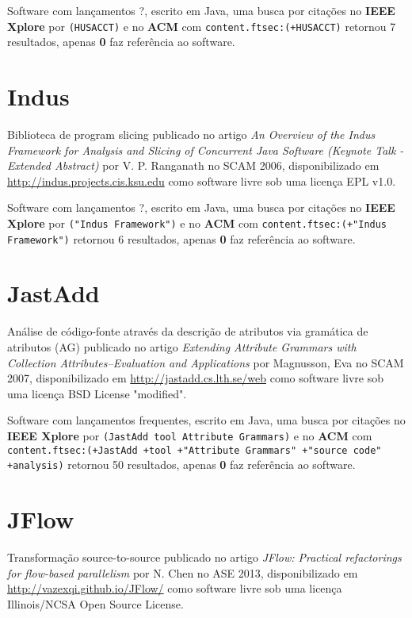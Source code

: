 Software com lançamentos ?,
escrito em Java,
uma busca por citações no {\bf IEEE Xplore} por
\texttt{(HUSACCT)}
e no {\bf ACM} com
\texttt{content.ftsec:(+HUSACCT)}
retornou
7 resultados, apenas
{\bf 0} faz referência ao software.



\section{Indus}

Biblioteca de program slicing
publicado no artigo {\it An Overview of the Indus Framework for Analysis and Slicing of Concurrent Java Software (Keynote Talk - Extended Abstract)}
por V. P. Ranganath
no SCAM 2006,
disponibilizado em \url{http://indus.projects.cis.ksu.edu}
como software livre
sob uma licença EPL v1.0.

Software com lançamentos ?,
escrito em Java,
uma busca por citações no {\bf IEEE Xplore} por
\texttt{("Indus Framework")}
e no {\bf ACM} com
\texttt{content.ftsec:(+"Indus Framework")}
retornou
6 resultados, apenas
{\bf 0} faz referência ao software.



\section{JastAdd}

Análise de código-fonte através da descrição de atributos via gramática de atributos (AG)
publicado no artigo {\it Extending Attribute Grammars with Collection Attributes--Evaluation and Applications}
por Magnusson, Eva
no SCAM 2007,
disponibilizado em \url{http://jastadd.cs.lth.se/web}
como software livre
sob uma licença BSD License "modified".

Software com lançamentos frequentes,
escrito em Java,
uma busca por citações no {\bf IEEE Xplore} por
\texttt{(JastAdd tool Attribute Grammars)}
e no {\bf ACM} com
\texttt{content.ftsec:(+JastAdd +tool +"Attribute Grammars" +"source code" +analysis)}
retornou
50 resultados, apenas
{\bf 0} faz referência ao software.



\section{JFlow}

Transformação source-to-source
publicado no artigo {\it JFlow: Practical refactorings for flow-based parallelism}
por N. Chen
no ASE 2013,
disponibilizado em \url{http://vazexqi.github.io/JFlow/}
como software livre
sob uma licença Illinois/NCSA Open Source License.

